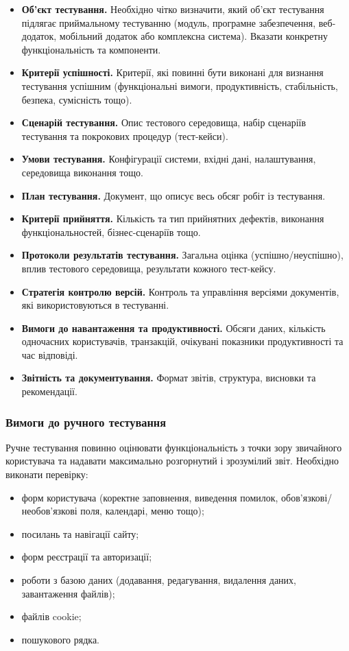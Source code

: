 \documentclass{article}
\begin{document}
\begin{itemize}
    \item \textbf{Об'єкт тестування.} Необхідно чітко визначити, який об'єкт тестування підлягає приймальному тестуванню (модуль, програмне забезпечення, веб-додаток, мобільний додаток або комплексна система). Вказати конкретну функціональність та компоненти.
    \item \textbf{Критерії успішності.} Критерії, які повинні бути виконані для визнання тестування успішним (функціональні вимоги, продуктивність, стабільність, безпека, сумісність тощо).
    \item \textbf{Сценарій тестування.} Опис тестового середовища, набір сценаріїв тестування та покрокових процедур (тест-кейси).
    \item \textbf{Умови тестування.} Конфігурації системи, вхідні дані, налаштування, середовища виконання тощо.
    \item \textbf{План тестування.} Документ, що описує весь обсяг робіт із тестування.
    \item \textbf{Критерії прийняття.} Кількість та тип прийнятних дефектів, виконання функціональностей, бізнес-сценаріїв тощо.
    \item \textbf{Протоколи результатів тестування.} Загальна оцінка (успішно/неуспішно), вплив тестового середовища, результати кожного тест-кейсу.
    \item \textbf{Стратегія контролю версій.} Контроль та управління версіями документів, які використовуються в тестуванні.
    \item \textbf{Вимоги до навантаження та продуктивності.} Обсяги даних, кількість одночасних користувачів, транзакцій, очікувані показники продуктивності та час відповіді.
    \item \textbf{Звітність та документування.} Формат звітів, структура, висновки та рекомендації.
\end{itemize}

\newpage
\subsubsection{Вимоги до ручного тестування}

Ручне тестування повинно оцінювати функціональність з точки зору звичайного
користувача та надавати максимально розгорнутий і зрозумілий звіт.
Необхідно виконати перевірку:

\begin{itemize}
    \item форм користувача (коректне заповнення, виведення помилок, обов’язкові/необов’язкові поля, календарі, меню тощо);
    \item посилань та навігації сайту;
    \item форм реєстрації та авторизації;
    \item роботи з базою даних (додавання, редагування, видалення даних, завантаження файлів);
    \item файлів cookie;
    \item пошукового рядка.
\end{itemize}
\end{document}
